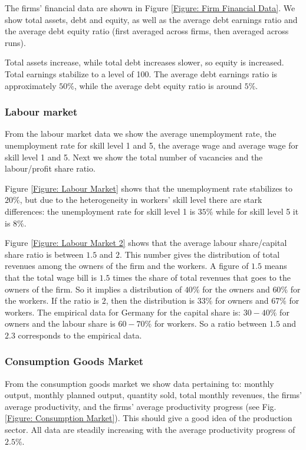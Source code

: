 The firms' financial data are shown in Figure \ref{Figure: Firm Financial Data}. We show total assets, debt and equity, as well as
the average debt earnings ratio and the average debt equity ratio (first averaged across firms, then averaged across runs).

Total assets increase, while total debt increases slower, so equity is increased. Total earnings stabilize to a level of 100.
The average debt earnings ratio is approximately $50\%$, while the average debt equity ratio is around $5\%$.

\subsubsection*{Labour market}
From the labour market data we show the average unemployment rate, the unemployment rate for skill level 1 and 5, the average wage and 
average wage for skill level 1 and 5. Next we show the total number of vacancies and the labour/profit share ratio.

Figure \ref{Figure: Labour Market} shows that the unemployment rate stabilizes to $20\%$, but due to the heterogeneity in workers' skill level there are stark differences: the unemployment rate for skill level 1 is $35\%$ while for skill level  5 it is $8\%$.

Figure \ref{Figure: Labour Market 2} shows that the average labour share/capital share ratio is between $1.5$ and $2$. This number gives the distribution of total revenues among the owners of the firm and the workers. A figure of $1.5$ means that the total wage bill is $1.5$ times the share of total revenues that goes to the owners of the firm. So it implies a distribution of $40\%$ for the owners and $60\%$ for the workers. If the ratio is $2$, then the distribution is $33\%$ for owners and $67\%$ for workers. The empirical data for Germany for the capital share is: $30-40\%$ for owners and the labour share is $60-70\%$ for workers. So a ratio between $1.5$ and $2.3$ corresponds to the empirical data.

\subsubsection*{Consumption Goods Market}
From the consumption goods market we show data pertaining to: monthly output, monthly planned output, quantity sold, total monthly revenues,
the firms' average productivity, and the firms' average productivity progress (see Fig. \ref{Figure: Consumption Market}). This should give a good idea of the production sector.
All data are steadily increasing with the average productivity progress of $2.5\%$.

